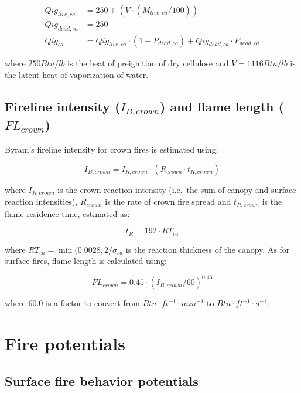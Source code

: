 \documentclass[]{book}
\begin{document}
\begin{eqnarray}
Qig_{live, ca} &= 250 + (V\cdot (M_{live, ca}/100))\\
Qig_{dead, ca} &= 250\\
Qig_{ca} &= Qig_{live, ca} \cdot (1 - P_{dead, ca})+ Qig_{dead, ca} \cdot P_{dead, ca}
\end{eqnarray}

where \(250 Btu/lb\) is the heat of preignition of dry cellulose and
\(V = 1116 Btu/lb\) is the latent heat of vaporization of water.

\subsection{\texorpdfstring{Fireline intensity (\(I_{B,crown}\)) and
flame length
(\(FL_{crown}\))}{Fireline intensity (I\_\{B,crown\}) and flame length (FL\_\{crown\})}}\label{fireline-intensity-i_bcrown-and-flame-length-fl_crown}

Byram's fireline intensity for crown fires is estimated using:

\begin{equation}
I_{B,crown} = I_{R,crown} \cdot (R_{crown} \cdot t_{R,crown})
\end{equation}

where \(I_{R,crown}\) is the crown reaction intensity (i.e.~the sum of
canopy and surface reaction intensities), \(R_{crown}\) is the rate of
crown fire spread and \(t_{R,crown}\) is the flame residence time,
estimated as:

\begin{equation}
t_R = 192 \cdot RT_{ca}
\end{equation}

where \(RT_{ca} = \min(0.0028, 2/\sigma_{ca}\) is the reaction thickness
of the canopy. As for surface fires, flame length is calculated using:

\begin{equation}
FL_{crown} = 0.45 \cdot (I_{B,crown}/60)^{0.46}
\end{equation}

where 60.0 is a factor to convert from
\(Btu\cdot ft^{-1} \cdot min^{-1}\) to
\(Btu\cdot ft^{-1} \cdot s^{-1}\).

\section{Fire potentials}\label{fire-potentials}

\subsection{Surface fire behavior
potentials}\label{surface-fire-behavior-potentials}
\end{document}
